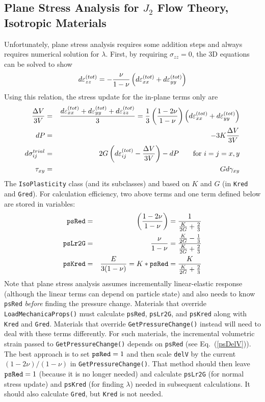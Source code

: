 \documentclass[11pt]{article}
\def\code#1{{\small\tt #1}}
\def\s#1{\sigma_{#1}}
\begin{document}
\subsection{Plane Stress Analysis for $J_2$ Flow Theory, Isotropic Materials}

Unfortunately, plane stress analysis requires some addition steps and always requires numerical solution for $\lambda$. First, by requiring $\s{zz}=0$, the 3D equations can be solved to show
\begin{equation}
         d\varepsilon_{zz}^{(tot)} = - {\nu\over 1-\nu}\left(d\varepsilon_{xx}^{(tot)} + d\varepsilon_{yy}^{(tot)}\right)
\end{equation}
Using this relation, the stress update for the in-plane terms only are
\begin{eqnarray}
       {\Delta V\over 3V} & = & {d\varepsilon_{xx}^{(tot)} + d\varepsilon_{yy}^{(tot)} + d\varepsilon_{zz}^{(tot)} \over 3} 
                             = {1\over 3}\left(1-2\nu\over 1-\nu\right)\left(d\varepsilon_{xx}^{(tot)} + d\varepsilon_{yy}^{(tot)}\right)      \label{psDelV} \\
       dP & = & -3K {\Delta V\over 3V} \\
       d\s{ij}^{trial} & = & 2G \left(d\varepsilon_{ij}^{(tot)} - {\Delta V\over 3V}\right) - dP  \qquad {\rm for\ }i=j=x,y\\
       \tau_{xy} & = & G d\gamma_{xy} \\
\end{eqnarray}
The \code{IsoPlasticity} class (and its subclasses) and based on $K$ and $G$ (in \code{Kred} and \code{Gred}). For calculation efficiency, two above terms and one term defined below are stored in variables:
\begin{eqnarray}
       \code{psRed} & = & \left(1-2\nu\over 1-\nu\right) = {1 \over {K\over 2G} + {2\over 3}} \\
       \code{psLr2G} & = & {\nu\over 1-\nu} ={{K\over 2G} - {1\over 3} \over {K\over 2G} + {2\over 3}} \\
       \code{psKred} & = & {E\over 3(1-\nu)} = K*\code{psRed} = {K \over {K\over 2G} + {2\over 3}}
\end{eqnarray}
Note that plane stress analysis assumes incrementally linear-elastic response (although the linear terms can depend on particle state) and also needs to know \code{psRed}  \emph{before} finding the pressure change. Materials that override \code{LoadMechanicaProps()} must calculate \code{psRed}, \code{psLr2G}, and \code{psKred} along with \code{Kred} and \code{Gred}. Materials that override \code{GetPressureChange()} instead will need to deal with these terms differently. For such materials, the incremental volumetric strain passed to \code{GetPressureChange()} depends on \code{psRed} (see Eq.~(\ref{psDelV})). The best approach is to set $\code{psRed}=1$ and then scale \code{delV} by the current $(1-2\nu)/(1-\nu)$ in \code{GetPressureChange()}. That method should then leave $\code{psRed}=1$ (because it is no longer needed) and calculate \code{psLr2G} (for normal stress update) and \code{psKred} (for finding $\lambda$) needed in subsequent calculations. It should also calculate \code{Gred}, but \code{Kred} is not needed.
\end{document}
